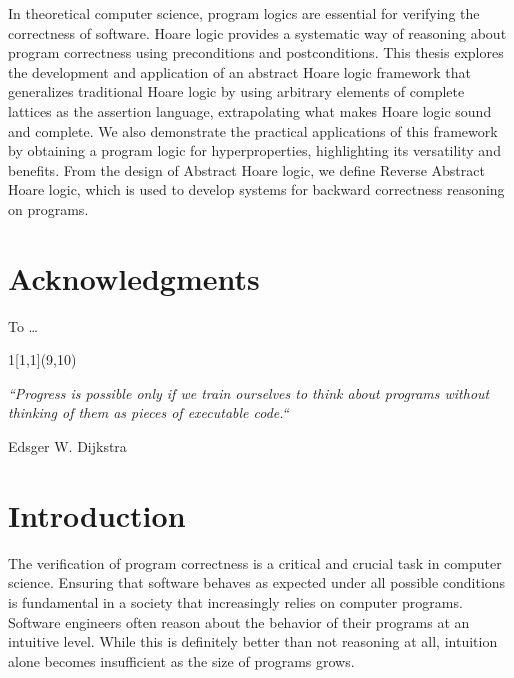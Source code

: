 \documentclass[
  10pt,       %
  twoside,    %
  a4paper,    %
  english,    %
  tikz,       %
  openright,  %
]{book}
\begin{document}
In theoretical computer science, program logics are essential for verifying the
correctness of software. Hoare logic provides a systematic way of reasoning
about program correctness using preconditions and postconditions. This thesis
explores the development and application of an abstract Hoare logic framework
that generalizes traditional Hoare logic by using arbitrary elements of
complete lattices as the assertion language, extrapolating what makes Hoare
logic sound and complete. We also demonstrate the practical applications of
this framework by obtaining a program logic for hyperproperties, highlighting
its versatility and benefits. From the design of Abstract Hoare logic, we
define Reverse Abstract Hoare logic, which is used to develop systems for
backward correctness reasoning on programs.

\vfill
\cleardoublepage
{}
{}

\begingroup

\chapter*{Acknowledgments}

To \dots

\begin{textblock}{1}[1,1](9,10)
  \epigraph{\textit{``Progress is possible only if we train ourselves to think 
  about programs without thinking of them as pieces of executable code.``}}
  {Edsger W. Dijkstra}
\end{textblock}


\endgroup
\cleardoublepage

\cleardoublepage

\begingroup
\hypersetup{linkcolor=black}
\tableofcontents
\endgroup

\cleardoublepage
\mainmatter

\chapter*{Introduction}

The verification of program correctness is a critical and crucial task in
computer science. Ensuring that software behaves as expected under all possible
conditions is fundamental in a society that increasingly relies on computer
programs. Software engineers often reason about the behavior of their programs
at an intuitive level. While this is definitely better than not reasoning at
all, intuition alone becomes insufficient as the size of programs grows.
\end{document}

